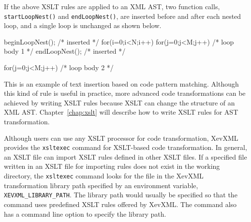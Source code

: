 If the above XSLT rules are applied to an XML AST, two function calls,
\texttt{startLoopNest()} and \texttt{endLoopNest()}, are inserted before
and after each nested loop, and a single loop is unchanged as shown
below.
\begin{framed}
\begin{src}
beginLoopNest(); /* inserted */
for(i=0;i<N;i++){
  for(j=0;j<M;j++){
    /* loop body 1 */
  }
}
endLoopNest();  /* inserted */

for(j=0;j<M;j++){
 /* loop body 2 */
}
\end{src}
\end{framed}
This is an example of text insertion based on code pattern matching.
Although this kind of rule is useful in practice, more advanced code
transformations can be achieved by writing XSLT rules because XSLT can
change the structure of an XML AST.  Chapter~\ref{chap:xslt} will
describe how to write XSLT rules for AST transformation.

Although users can use any XSLT processor for code transformation,
XevXML provides the \texttt{xsltexec} command for XSLT-based code
transformation. In general, an XSLT file can import XSLT rules defined
in other XSLT files. If a specified file written in an XSLT file for
importing rules does not exist in the working directory, the
\texttt{xsltexec} command looks for the file in the XevXML
transformation library path specified by an environment variable,
\texttt{XEVXML\_LIBRARY\_PATH}. The library path would usually be
specified so that the command uses predefined XSLT rules offered by
XevXML.  The command also has a command line option to specify the
library path.


